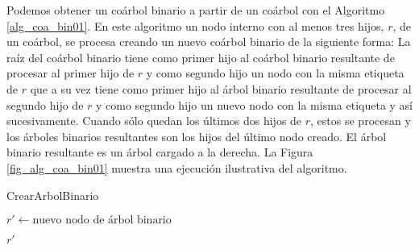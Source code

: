 Podemos obtener un coárbol binario a partir de un coárbol con el Algoritmo \ref{alg_coa_bin01}. En este algoritmo un nodo interno con al menos tres hijos, $r$, de un coárbol, se procesa creando un nuevo coárbol binario de la siguiente forma: La raíz del coárbol binario tiene como primer hijo al coárbol binario resultante de procesar al primer hijo de $r$ y como segundo hijo un nodo con la misma etiqueta de $r$ que a su vez tiene como primer hijo al árbol binario resultante de procesar al segundo hijo de $r$ y como segundo hijo un nuevo nodo con la misma etiqueta y así sucesivamente. Cuando sólo quedan los últimos dos hijos de $r$, estos se procesan y los árboles binarios resultantes son los hijos del último nodo creado. El árbol binario resultante es un árbol cargado a la derecha. La Figura \ref{fig_alg_coa_bin01} muestra una ejecución ilustrativa del algoritmo.

\begin{algorithm}[ht!]
\caption{CrearArbolBinario}
\label{alg_coa_bin01}
\DontPrintSemicolon %

$r' \gets \text{nuevo nodo de árbol binario}$\;

\Return $r'$\;

\end{algorithm}

